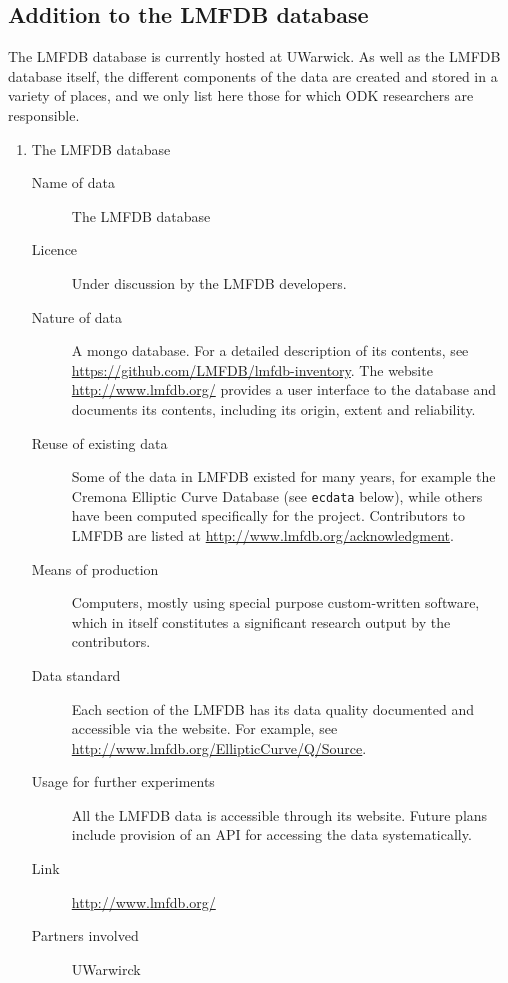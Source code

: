 \documentclass{deliverablereport}
\begin{document}
\subsection{Addition to the LMFDB database}

The LMFDB database is currently hosted at UWarwick.  As well as the LMFDB database itself, the different components of the data are created and stored in a variety of places, and we only list here those for which ODK researchers are responsible.

\begin{enumerate}

\item{The LMFDB database}
\begin{description}
\item[Name of data] The LMFDB database
\item[Licence]  Under discussion by the LMFDB developers.
\item[Nature of data] A mongo database.  For a detailed description of its contents, see \url{https://github.com/LMFDB/lmfdb-inventory}. The website \url{http://www.lmfdb.org/} provides a user interface to the database and documents its contents, including its origin, extent and reliability.
\item[Reuse of existing data] Some of the data in LMFDB existed for many years, for example the Cremona Elliptic Curve Database (see {\tt ecdata} below), while others have been computed specifically for the project.   Contributors to LMFDB are listed at \url{http://www.lmfdb.org/acknowledgment}.
\item[Means of production] Computers, mostly using special purpose custom-written software, which in itself constitutes a significant research output by the contributors.
\item[Data standard] Each section of the LMFDB has its data quality documented and accessible via the website.  For example, see  \url{http://www.lmfdb.org/EllipticCurve/Q/Source}.
\item [Usage for further experiments] All the LMFDB data is accessible through its website.  Future plans include provision of an API for accessing the data systematically.
\item [Link]  \url{http://www.lmfdb.org/}
\item[Partners involved] UWarwirck
\end{description}


\end{enumerate}
\end{document}
